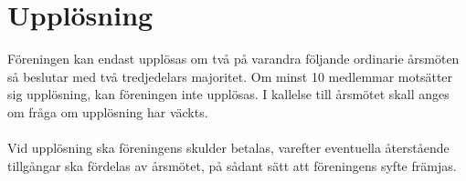 \documentclass[a4paper,11pt]{article}
\begin{document}
\section{Upplösning}

Föreningen kan endast upplösas om två på varandra följande ordinarie årsmöten så beslutar med två tredjedelars majoritet. Om minst 10 medlemmar motsätter sig upplösning, kan föreningen inte upplösas. I kallelse till årsmötet skall anges om fråga om upplösning har väckts.
\paragraph{}
Vid upplösning ska föreningens skulder betalas, varefter eventuella återstående tillgångar ska fördelas av årsmötet, på sådant sätt att föreningens syfte främjas. 

\end{document}
